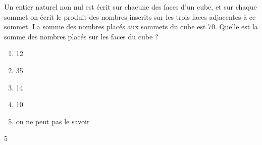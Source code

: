 Un entier naturel non nul est écrit sur chacune des faces d'un cube, et sur chaque sommet on écrit le produit des nombres inscrits sur les trois faces adjacentes à ce sommet. La somme des nombres placés aux sommets du cube est 70. Quelle est la somme des nombres placés sur les faces du cube ?
\begin{multicols}{2}
  \begin{enumerate}[A/]
  \item 12
  \item 35
  \item 14
  \item 10
  \item on ne peut pas le savoir
  \end{enumerate}
\end{multicols}{5}